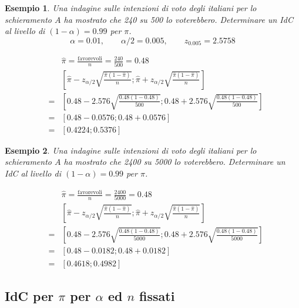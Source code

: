 \documentclass[
  11pt,
]{book}
\theoremstyle{mytheoremstyle}
\theoremstyle{mydefstyle}
\newtheorem{example}{{Esempio}}[section]
\begin{document}
\begin{example}
Una indagine sulle intenzioni di voto degli italiani per lo schieramento \(A\) ha mostrato
che 240 su 500 lo voterebbero. Determinare un IdC al livello di \((1-\alpha)=0.99\) per \(\pi\).
\[\alpha=0.01,\qquad \alpha/2=0.005,\qquad z_{0.005}=2.5758\]

\begin{eqnarray*}
& & \hat\pi = \frac{\mbox{favorevoli}} {n}
                = \frac{240} {500} = 0.48                            \\
& & \left[\hat\pi -z_{\alpha/2}
          \sqrt{\frac{\hat\pi (1-\hat\pi)} {n}};
          \hat\pi +z_{\alpha/2}
          \sqrt{\frac{\hat\pi (1-\hat\pi)} {n}} \right]     \\
&=& \left[  0.48 -2.576 \sqrt{\frac{0.48 (1-0.48)} {500}}; 0.48 +2.576 \sqrt{\frac{0.48 (1-0.48)} {500}} \right]  \\
&=& \left[ 0.48 - 0.0576; 0.48 + 0.0576\right]                     \\
&=& \left[ 0.4224; 0.5376 \right]
\end{eqnarray*}
\end{example}

\begin{example}
Una indagine sulle intenzioni di voto degli italiani per lo schieramento \(A\) ha mostrato
che 2400 su 5000 lo voterebbero. Determinare un IdC al livello di \((1-\alpha)=0.99\) per \(\pi\).

\begin{eqnarray*}
& & \hat\pi = \frac{\mbox{favorevoli}} {n}
                = \frac{2400} {5000} = 0.48                            \\
& & \left[\hat\pi -z_{\alpha/2}
          \sqrt{\frac{\hat\pi (1-\hat\pi)} {n}};
          \hat\pi +z_{\alpha/2}
          \sqrt{\frac{\hat\pi (1-\hat\pi)} {n}} \right]     \\
&=& \left[  0.48 -2.576 \sqrt{\frac{0.48 (1-0.48)} {5000}}; 0.48 +2.576 \sqrt{\frac{0.48 (1-0.48)} {5000}} \right]  \\
&=& \left[ 0.48 - 0.0182; 0.48 + 0.0182\right]                     \\
&=& \left[ 0.4618; 0.4982 \right]
\end{eqnarray*}
\end{example}

\subsection{\texorpdfstring{IdC per \(\pi\) per \(\alpha\) ed \(n\) fissati}{IdC per \textbackslash pi per \textbackslash alpha ed n fissati}}\label{idc-per-pi-per-alpha-ed-n-fissati}
\end{document}
